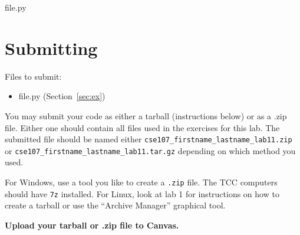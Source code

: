 \documentclass[11pt]{cselabheader}
\begin{document}
\begin{description}
  \item[file.py]
\end{description}

\pagebreak
\section{Submitting}

Files to submit:
\begin{itemize}
\item file.py (Section~\ref{sec:ex})
\end{itemize}

You may submit your code as either a tarball (instructions below) or as a .zip
file. Either one should contain all files used in the exercises for this lab.
The submitted file should be named either
\texttt{cse107\_firstname\_lastname\_lab11.zip} or
\texttt{cse107\_firstname\_lastname\_lab11.tar.gz} depending on which method you
used.

For Windows, use a tool you like to create a \texttt{.zip} file. The TCC
computers should have \texttt{7z} installed. For Linux, look at lab 1 for
instructions on how to create a tarball or use the ``Archive Manager'' graphical
tool.

\begin{center}
  \textbf{Upload your tarball or .zip file to Canvas.}
\end{center}
\end{document}
